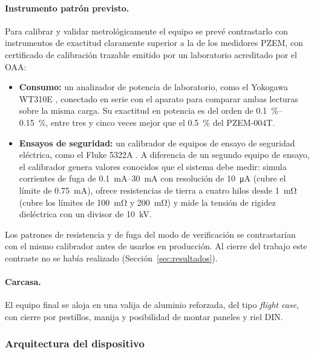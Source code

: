 \paragraph{Instrumento patrón previsto.}
Para calibrar y validar metrológicamente el equipo se prevé contrastarlo con
instrumentos de exactitud claramente superior a la de los medidores PZEM, con
certificado de calibración trazable emitido por un laboratorio acreditado por el
OAA:
\begin{itemize}
    \item \textbf{Consumo:} un analizador de potencia de laboratorio, como el
          Yokogawa WT310E \cite{wt310e}, conectado en serie con el aparato para
          comparar ambas lecturas sobre la misma carga. Su exactitud en potencia
          es del orden de \SIrange{0,1}{0,15}{\percent}, entre tres y cinco veces
          mejor que el \SI{0,5}{\percent} del PZEM-004T.
    \item \textbf{Ensayos de seguridad:} un calibrador de equipos de ensayo de
          seguridad eléctrica, como el Fluke 5322A \cite{fluke5322a}. A
          diferencia de un segundo equipo de ensayo, el calibrador genera
          valores conocidos que el sistema debe medir: simula corrientes de fuga
          de \SIrange{0,1}{30}{\milli\ampere} con resolución de
          \SI{10}{\micro\ampere} (cubre el límite de \SI{0,75}{\milli\ampere}),
          ofrece resistencias de tierra a cuatro hilos desde
          \SI{1}{\milli\ohm} (cubre los límites de \SI{100}{\milli\ohm} y
          \SI{200}{\milli\ohm}) y mide la tensión de rigidez dieléctrica con un
          divisor de \SI{10}{\kilo\volt}.
\end{itemize}
Los patrones de resistencia y de fuga del modo de verificación se contrastarían
con el mismo calibrador antes de usarlos en producción.
Al cierre del trabajo este contraste no se había realizado
(Sección~\ref{sec:resultados}).

\paragraph{Carcasa.}
El equipo final se aloja en una valija de aluminio reforzada, del tipo
\emph{flight case}, con cierre por pestillos, manija y posibilidad de montar
paneles y riel DIN.

\subsubsection{Arquitectura del dispositivo}

